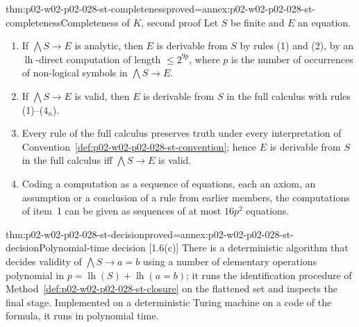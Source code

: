 \begin{hbtheorem}{thm:p02-w02-p02-028-st-completeness}{proved=annex:p02-w02-p02-028-st-completeness}{Completeness of \(K\), second proof}
Let \(S\) be finite and \(E\) an equation.
\begin{enumerate}
  \item If \(\bigwedge S\to E\) is analytic, then \(E\) is derivable from
        \(S\) by rules (1) and (2), by an \(\operatorname{lh}\)-direct
        computation of length \(\leq2^{9p}\), where \(p\) is the number of
        occurrences of non-logical symbols in \(\bigwedge S\to E\).
  \item If \(\bigwedge S\to E\) is valid, then \(E\) is derivable from \(S\)
        in the full calculus with rules (1)--(\(4_n\)).
  \item Every rule of the full calculus preserves truth under every
        interpretation of Convention~\ref{def:p02-w02-p02-028-st-convention};
        hence \(E\) is derivable from \(S\) in the full calculus iff
        \(\bigwedge S\to E\) is valid.
  \item Coding a computation as a sequence of equations, each an axiom, an
        assumption or a conclusion of a rule from earlier members, the
        computations of item~1 can be given as sequences of at most
        \(16p^2\) equations.
\end{enumerate}
\end{hbtheorem}

\begin{hbtheorem}{thm:p02-w02-p02-028-st-decision}{proved=annex:p02-w02-p02-028-st-decision}{Polynomial-time decision [1.6(c)]}
There is a deterministic algorithm that decides validity of
\(\bigwedge S\to a=b\) using a number of elementary operations polynomial in
\(p=\operatorname{lh}(S)+\operatorname{lh}(a=b)\); it runs the identification
procedure of Method~\ref{def:p02-w02-p02-028-st-closure} on the flattened set
and inspects the final stage.  Implemented on a deterministic Turing machine
on a code of the formula, it runs in polynomial time.
\end{hbtheorem}


